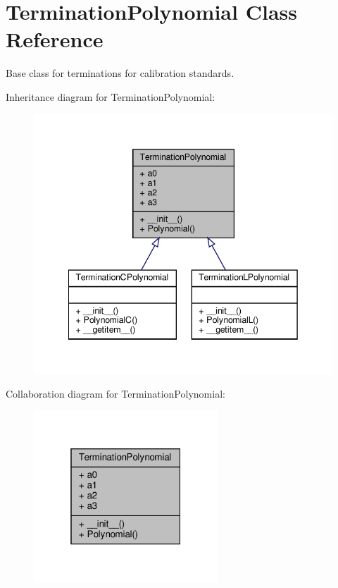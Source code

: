 \hypertarget{classSignalIntegrity_1_1Measurement_1_1CalKit_1_1Standards_1_1TerminationPolynomial_1_1TerminationPolynomial}{}\section{Termination\+Polynomial Class Reference}
\label{classSignalIntegrity_1_1Measurement_1_1CalKit_1_1Standards_1_1TerminationPolynomial_1_1TerminationPolynomial}


Base class for terminations for calibration standards.  




Inheritance diagram for Termination\+Polynomial\+:
\nopagebreak
\begin{figure}[H]
\begin{center}
\leavevmode
\includegraphics[width=342pt]{classSignalIntegrity_1_1Measurement_1_1CalKit_1_1Standards_1_1TerminationPolynomial_1_1TerminationPolynomial__inherit__graph}
\end{center}
\end{figure}


Collaboration diagram for Termination\+Polynomial\+:
\nopagebreak
\begin{figure}[H]
\begin{center}
\leavevmode
\includegraphics[width=196pt]{classSignalIntegrity_1_1Measurement_1_1CalKit_1_1Standards_1_1TerminationPolynomial_1_1TerminationPolynomial__coll__graph}
\end{center}
\end{figure}

